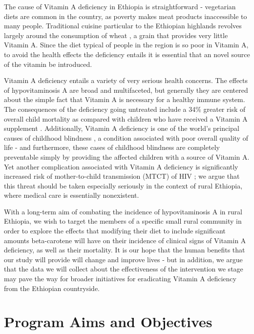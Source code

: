 \documentclass[12pt, letterpaper, draft]{article}
\begin{document}
The cause of Vitamin A deficiency in Ethiopia is straightforward - vegetarian diets are common in the country, as poverty makes meat products inaccessible to many people. Traditional cuisine particular to the Ethiopian highlands revolves largely around the consumption of wheat \cite{gelalcha2000milling}, a grain that provides very little Vitamin A. Since the diet typical of people in the region is so poor in Vitamin A, to avoid the health effects the deficiency entails it is essential that an novel source of the vitamin be introduced.

Vitamin A deficiency entails a variety of very serious health concerns. The effects of hypovitaminosis A are broad and multifaceted, but generally they are centered about the simple fact that Vitamin A is necessary for a healthy immune system. The consequences of the deficiency going untreated include a 34\% greater risk of overall child mortality as compared with children who have received a Vitamin A supplement \cite{sommer1992vitamin}. Additionally, Vitamin A deficiency is one of the world's principal causes of childhood blindness \cite{world2009global}, a condition associated with poor overall quality of life - and furthermore, these cases of childhood blindness are completely preventable simply by providing the affected children with a source of Vitamin A. Yet another complication associated with Vitamin A deficiency is significantly increased risk of mother-to-child transmission (MTCT) of HIV \cite{semba1994maternal}; we argue that this threat should be taken especially seriously in the context of rural Ethiopia, where medical care is essentially nonexistent. 

With a long-term aim of combating the incidence of hypovitaminosis A in rural Ethiopia, we wish to target the members of a specific small rural community in order to explore the effects that modifying their diet to include significant amounts beta-carotene will have on their incidence of clinical signs of Vitamin A deficiency, as well as their mortality. It is our hope that the human benefits that our study will provide will change and improve lives - but in addition, we argue that the data we will collect about the effectiveness of the intervention we stage may pave the way for broader initiatives for eradicating Vitamin A deficiency from the Ethiopian countryside.

\section{Program Aims and Objectives} %
\end{document}
